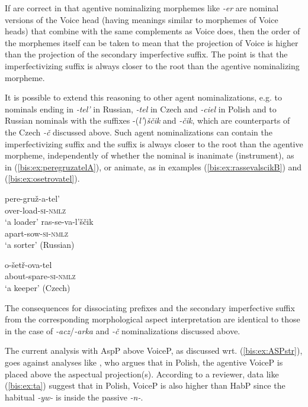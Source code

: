 \documentclass[output=paper]{langscibook}
\begin{document}
If \citet{Baker.Vinokurova2009} are correct in that agentive nominalizing morphemes like \textit{-er} are nominal versions of the Voice head (having meanings similar to morphemes of Voice heads) that combine with the same complements as Voice does, then the order of the morphemes itself can be taken to mean that the projection of Voice is higher than the projection of the secondary imperfective suffix. The point is that the imperfectivizing suffix is always closer to the root than the agentive nominalizing morpheme.

It is possible to extend this reasoning to other agent nominalizations, e.g. to nominals ending in \textit{-tel’} in Russian, \textit{-tel} in Czech and \textit{-ciel} in Polish and to Russian nominals with the suffixes -(\textit{l’})\textit{ščik} and \textit{-čik}, which are counterparts of the Czech \textit{-č} discussed above. Such agent nominalizations can contain the imperfectivizing suffix and the suffix is always closer to the root than the agentive morpheme, independently of whether the nominal is inanimate (instrument), as in (\ref{bis:ex:peregruzatelA}), or animate, as in examples (\ref{bis:ex:rassevalscikB}) and (\ref{bis:ex:osetrovatel}).

\ea\label{bis:ex:peregruzatel}
\ea\label{bis:ex:peregruzatelA}
\gll 
pere-gruž-a-tel’ \\
over-load-\textsc{si}-\textsc{nmlz} \\
\glt ‘a loader’ 
\ex\label{bis:ex:rassevalscikB}
\gll 
ras-se-va-l’ščik \\
apart-sow-\textsc{si}-\textsc{nmlz} \\
\glt ‘a sorter’	
\hfill (Russian)
\z
\z

\ea\label{bis:ex:osetrovatel}
\gll 
o-šetř-ova-tel \\
about-spare-\textsc{si}-\textsc{nmlz} \\
\glt ‘a keeper’ 
\hfill (Czech)
\z

\noindent The consequences for dissociating prefixes and the secondary imperfective suffix from the corresponding morphological aspect interpretation are identical to those in the case of \textit{-acz}/\textit{-arka} and \textit{-č} nominalizations discussed above.

The current analysis with AspP above VoiceP, as discussed wrt. (\ref{bis:ex:ASPstr}), goes against analyses like \citet[571, 585]{Zdziebko2017}, who argues that in Polish, the agentive VoiceP is placed above the aspectual projection(s). According to a reviewer, data like (\ref{bis:ex:ta}) suggest that in Polish, VoiceP is also higher than HabP since the habitual \textit{-yw-} is inside the passive \textit{-n-}.
\end{document}
